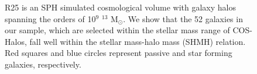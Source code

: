 \documentclass[]{emulateapj}
\begin{document}
\begin{figure}[]
\centerline{}
\caption[]{R25 is an SPH simulated cosmological volume with galaxy halos spanning the orders of 10$^{9}$ $^{13}$ M$_{\odot}$. We show that the 52 galaxies in our sample, which are selected within the stellar mass range of COS-Halos, fall well within the stellar mass-halo mass (SHMH) relation. Red squares and blue circles represent passive and star forming galaxies, respectively.}
\label{fig-massmetal}
\end{figure}
\end{document}
